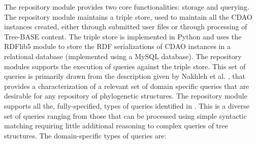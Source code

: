 \documentclass[10pt]{article}
\begin{document}
The repository module provides two core functionalities: storage and querying.
The repository module maintains a triple store, used to maintain all the CDAO
instances created, either through submitted user files or through processing of
Tree-BASE content. The triple store is implemented in Python and uses the
RDFlib5 module to store the RDF serializations of CDAO instances in a
relational database (implemented using a MySQL database).  The repository
modules supports the execution of queries against the triple store. This set of
queries is primarily drawn from the description given by Nakhleh et al. \cite{queries},
that provides a characterization of a relevant set of domain specific queries
that are desirable for any repository of phylogenetic structures. The
repository module supports all the, fully-specified, types of queries
identified in \cite{queries}. This is a diverse set of queries ranging from those that
can be processed using simple syntactic matching requiring little additional
reasoning to complex queries of tree structures. The domain-specific types of
queries are:
\end{document}
